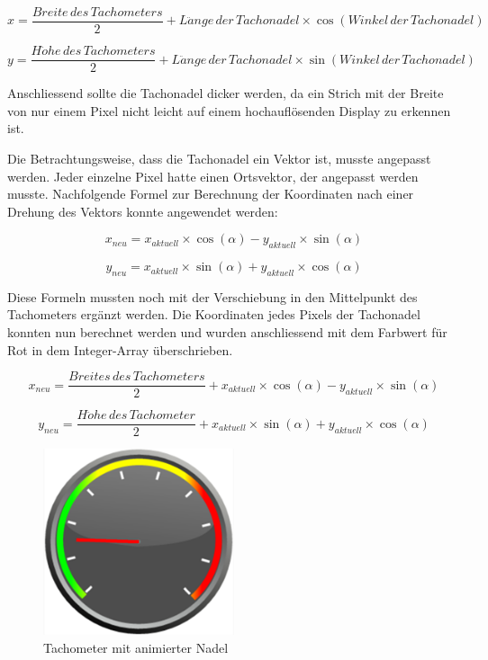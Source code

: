 \begin{equation}
	x = \frac{Breite\, des\, Tachometers}{2} + L\ddot{a}nge\, der\, Tachonadel \times \cos(Winkel\, der\, Tachonadel)
\end{equation}

\begin{equation}
	y = \frac{H\ddot{o}he\, des\, Tachometers}{2} + L\ddot{a}nge\, der\, Tachonadel \times \sin(Winkel\, der\, Tachonadel)
\end{equation}

Anschliessend sollte die Tachonadel dicker werden, da ein Strich mit der Breite von nur einem Pixel nicht leicht auf einem hochauflösenden Display zu erkennen ist.

Die Betrachtungsweise, dass die Tachonadel ein Vektor ist, musste angepasst werden. Jeder einzelne Pixel hatte einen Ortsvektor, der angepasst werden musste. Nachfolgende Formel zur Berechnung der Koordinaten nach einer Drehung des Vektors konnte angewendet werden:

\begin{equation}
	x_{neu} = x_{aktuell} \times \cos(\alpha) - y_{aktuell} \times \sin(\alpha)
\end{equation}

\begin{equation}
	y_{neu} = x_{aktuell} \times \sin(\alpha) + y_{aktuell} \times \cos(\alpha)
\end{equation}

Diese Formeln mussten noch mit der Verschiebung in den Mittelpunkt des Tachometers ergänzt werden. Die Koordinaten jedes Pixels der Tachonadel konnten nun berechnet werden und wurden anschliessend mit dem Farbwert für Rot in dem Integer-Array überschrieben.

\begin{equation}
	x_{neu} = \frac{Breites\,des\,Tachometers}{2} + x_{aktuell} \times \cos(\alpha) - y_{aktuell} \times \sin(\alpha)
\end{equation}

\begin{equation}
	y_{neu} = \frac{H\ddot{o}he\,des\,Tachometer}{2} + x_{aktuell} \times \sin(\alpha) + y_{aktuell} \times \cos(\alpha)
\end{equation}

\begin{figure}[ht]
    \includegraphics[width=0.5\textwidth]{3Vorgehen/imag/tachometer_mit_nadel.png}
    \caption{Tachometer mit animierter Nadel}
	\label{tachometer_mit_nadel} 
\end{figure}

